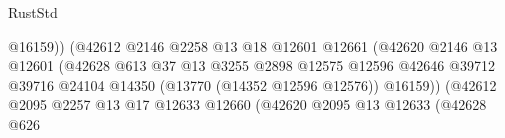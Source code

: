 \begin{lexlean}{RustStd}
\begin{coremodule}
                                                          @16159))
                                                      (@42612
                                                        @2146
                                                        @2258
                                                        @13
                                                        @18
                                                        @12601
                                                        @12661
                                                        (@42620
                                                          @2146
                                                          @13
                                                          @12601
                                                          (@42628
                                                            @613
                                                            @37
                                                            @13
                                                            @3255
                                                            @2898
                                                            @12575
                                                            @12596
                                                            @42646
                                                            @39712
                                                            @39716
                                                            @24104
                                                            @14350
                                                            (@13770 (@14352 @12596 @12576))
                                                            @16159))
                                                        (@42612
                                                          @2095
                                                          @2257
                                                          @13
                                                          @17
                                                          @12633
                                                          @12660
                                                          (@42620
                                                            @2095
                                                            @13
                                                            @12633
                                                            (@42628
                                                              @626

\end{coremodule}
\end{lexlean}
